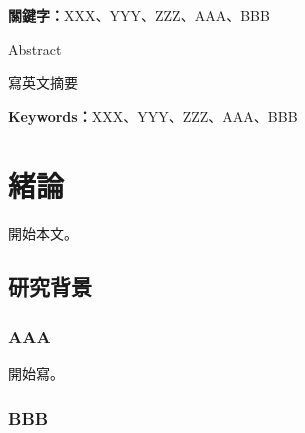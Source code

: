 \documentclass{ctexart}
\begin{document}
\vspace{1cm} %
\noindent %
\textbf{關鍵字：}XXX、YYY、ZZZ、AAA、BBB
\thispagestyle{plain} %
\newpage

\begin{center}
    {\fontsize{20}{24}\selectfont Abstract} %
\end{center}
\vspace{0.5cm} %
\noindent %
\par
\begin{onehalfspacing}
寫英文摘要
\end{onehalfspacing}


\vspace{1cm} %
\noindent %
\textbf{Keywords：}XXX、YYY、ZZZ、AAA、BBB
\thispagestyle{plain} %
\newpage


\renewcommand{\contentsname}{目次}
\tableofcontents
\newpage

\renewcommand{\listtablename}{表目次}
\listoftables
{} %
\newpage

\renewcommand{\listfigurename}{圖目次}
\listoffigures
{} %
\newpage


\makeatletter
\renewcommand{\l@figure}[2]{%
  \noindent\makebox[2.5em][l]{\figurename\  #1:} #2\par}
\makeatother

\setcounter{page}{1}

\section{緒論}
\begin{doublespace}


\indent 開始本文。

\subsection{研究背景}
\subsubsection{AAA} 
 開始寫。

\subsubsection{BBB}

\end{doublespace}
\newpage
\end{document}
